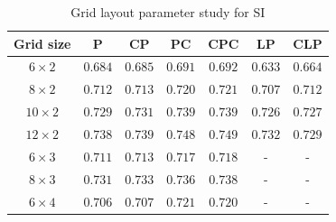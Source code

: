 \documentclass[thesis.tex]{subfiles}
\begin{document}
%
\begin{table}[tb]
\centering
\begin{tabular}{ c c c c c c c }
\toprule
Grid size & P & CP & PC & CPC & LP & CLP \\ \midrule
$6 \times 2$ & $0.684$ & $0.685$ & $0.691$ & $0.692$ & $0.633$ & $0.664$ \\ 
$8 \times 2$ & $0.712$ & $0.713$ & $0.720$ & $0.721$ & $0.707$ & $0.712$ \\ 
$10 \times 2$ & $0.729$ & $0.731$ & $0.739$ & $0.739$ & $0.726$ & $0.727$ \\ 
$12 \times 2$ & $0.738$ & $0.739$ & $0.748$ & $\mathbf{0.749}$ & $0.732$ & $0.729$ \\ 
$6 \times 3$ & $0.711$ & $0.713$ & $0.717$ & $0.718$ & - & - \\ 
$8 \times 3$ & $0.731$ & $0.733$ & $0.736$ & $0.738$ & - & - \\ 
$6 \times 4$ & $0.706$ & $0.707$ & $0.721$ & $0.720$ & - & - \\
\bottomrule
\end{tabular}
\caption{Grid layout parameter study for SI}
\label{tbl:dtuLayoutParametersSi}
\end{table}
%
\end{document}
